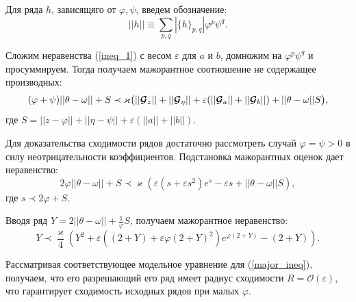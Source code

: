 Для ряда $h$, зависящяго от $\varphi, \psi$, введем обозначение:
$$||h|| \equiv \sum_{p,q} |\{h\}_{p,q}| \varphi^p \psi^q.$$

Сложим неравенства (\ref{ineq_1}) с весом $\varepsilon$ для $a$ и $b$, домножим на $\varphi^p \psi^q$ и просуммируем. Тогда получаем мажорантное соотношение не содержащее производных:
\begin{equation}
(\varphi+\psi) ||\theta - \omega|| + S  \prec \varkappa \big( ||\boldsymbol{\mathcal{G}}_z||+||\boldsymbol{\mathcal{G}}_\eta||+\varepsilon(||\boldsymbol{\mathcal{G}}_a||+||\boldsymbol{\mathcal{G}}_b||) + ||\theta-\omega||S \big),
\label{major_eq}
\end{equation}
где $S = ||z-\varphi||+||\eta-\psi||+\varepsilon (||a||+||b||)$.

Для доказательства сходимости рядов достаточно рассмотреть случай $\varphi=\psi>0$ в силу неотрицательности коэффициентов. Подстановка мажорантных оценок дает неравенство:
\begin{equation*}
2\varphi ||\theta-\omega|| + S \prec \varkappa \left( \varepsilon(s + \varepsilon s^2)e^{s} - \varepsilon s + ||\theta-\omega||S \right),
\end{equation*}
где $s \prec 2\varphi + S$.

Вводя ряд $Y = 2||\theta-\omega|| + \frac{1}{\varphi}S$, получаем мажорантное неравенство:
\begin{equation}
Y \prec \frac{\varkappa}{4} \left( Y^2 + \varepsilon\left( (2+Y) + \varepsilon\varphi(2+Y)^2 \right) e^{\varphi(2+Y)} - (2+Y) \right).
\label{major_ineq}
\end{equation}

Рассматривая соответствующее модельное уравнение для (\ref{major_ineq}), получаем, что его разрешающий его ряд имеет радиус сходимости $R = \mathcal{O}(\varepsilon)$, что гарантирует сходимость исходных рядов при малых $\varphi$.